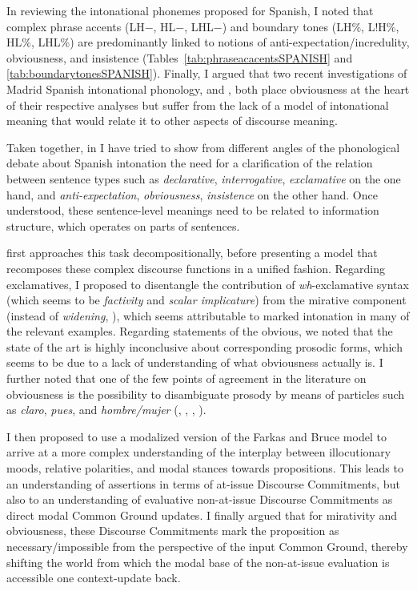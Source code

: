 In reviewing the intonational phonemes proposed for Spanish, I noted that complex phrase accents (LH$-$, HL$-$, LHL$-$) and boundary tones (LH\%, L!H\%, HL\%, LHL\%) are predominantly linked to notions of anti-expectation/incredulity, obviousness, and insistence (Tables~\ref{tab:phraseacacentsSPANISH} and \ref{tab:boundarytonesSPANISH}). Finally, I argued that two recent investigations of Madrid Spanish intonational phonology, \citet{ElviraGarcia.2016} and \citet{TorreiraGrice.2018}, both place obviousness at the heart of their respective analyses but suffer from the lack of a model of intonational meaning that would relate it to other aspects of discourse meaning.

Taken together, in  I have tried to show from different angles of the phonological debate about Spanish intonation the need for a clarification of the relation between sentence types such as \textit{declarative}, \textit{interrogative}, \textit{exclamative} on the one hand, and \textit{anti-expectation}, \textit{obviousness}, \textit{insistence} on the other hand. Once understood, these sen\-tence-lev\-el meanings need to be related to information structure, which operates on parts of sentences.

 first approaches this task decompositionally, before presenting a model that recomposes these complex discourse functions in a unified fashion. Regarding exclamatives, I proposed to disentangle the contribution of \textit{wh}-ex\-clam\-a\-tive syntax (which seems to be \textit{factivity} and \textit{scalar implicature}) from the mirative component (instead of \textit{widening}, \cite{ZanuttiniPortner2003}), which seems attributable to marked intonation in many of the relevant examples. Regarding statements of the obvious, we noted that the state of the art is highly inconclusive about corresponding prosodic forms, which seems to be due to a lack of understanding of what obviousness actually is. I further noted that one of the few points of agreement in the literature on obviousness is the possibility to disambiguate prosody by means of particles such as \textit{claro}, \textit{pues}, and \textit{hombre/mujer} (\cite[19]{BeckmanETAL.2002}, \cite{Prieto2009-2013}, \cite[278]{Hualde.2014}, \cite{TorreiraGrice.2018}).

I then proposed to use a modalized version of the Farkas and Bruce model \citep{FarkasBruce.2010, Rett.2021emotivemarkers} to arrive at a more complex understanding of the interplay between illocutionary moods, relative polarities, and modal stances towards propositions. This leads to an understanding of assertions in terms of at-issue Discourse Commitments, but also to an understanding of evaluative non-at-issue Discourse Commitments as direct modal Common Ground updates. I finally argued that for mirativity and obviousness, these Discourse Commitments mark the proposition as necessary/impossible from the perspective of the input Common Ground, thereby shifting the world from which the modal base of the non-at-issue evaluation is accessible one context-update back. 

